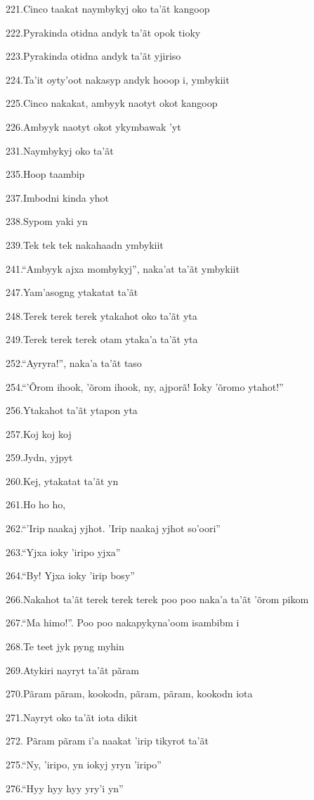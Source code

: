 221.Cinco taakat naymbykyj oko ta'ãt kangoop

222.Pyrakinda otidna andyk ta'ãt opok tioky

223.Pyrakinda otidna andyk ta'ãt yjiriso

224.Ta'it oyty'oot nakasyp andyk hooop i, ymbykiit

225.Cinco nakakat, ambyyk naotyt okot kangoop

226.Ambyyk naotyt okot ykymbawak 'yt

231.Naymbykyj oko ta'ãt

235.Hoop taambip

237.Imbodni kinda yhot

238.Sypom yaki yn

239.Tek tek tek nakahaadn ymbykiit

241.``Ambyyk ajxa mombykyj'', naka'at ta'ãt ymbykiit

247.Yam'asogng ytakatat ta'ãt

248.Terek terek terek ytakahot oko ta'ãt yta

249.Terek terek terek otam ytaka'a ta'ãt yta

252.``Ayryra!'', naka'a ta'ãt taso

254.``'Õrom ihook, 'õrom ihook, ny, ajporã! Ioky 'õromo ytahot!''

256.Ytakahot ta'ãt ytapon yta

257.Koj koj koj

259.Jydn, yjpyt

260.Kej, ytakatat ta'ãt yn

261.Ho ho ho,

262.``'Irip naakaj yjhot. 'Irip naakaj yjhot so'oori''

263.``Yjxa ioky 'iripo yjxa''

264.``By! Yjxa ioky 'irip bosy''

266.Nakahot ta'ãt terek terek terek poo poo naka'a ta'ãt 'õrom pikom

267.``Ma himo!''. Poo poo nakapykyna'oom isambibm i

268.Te teet jyk pyng myhin

269.Atykiri nayryt ta'ãt pãram

270.Pãram pãram, kookodn, pãram, pãram, kookodn iota

271.Nayryt oko ta'ãt iota dikit

272. Pãram pãram i'a naakat 'irip tikyrot ta'ãt

275.``Ny, 'iripo, yn iokyj yryn 'iripo''

276.``Hyy hyy hyy yry'i yn''


